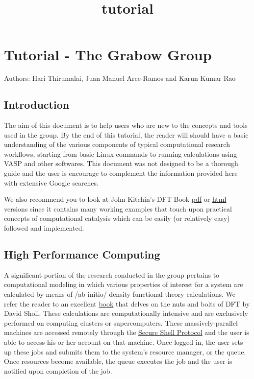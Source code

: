 \documentclass[11pt]{article}
\title{tutorial}
\begin{document}
    
    
    \maketitle
    
    

    
    \section{Tutorial - The Grabow Group}\label{tutorial---the-grabow-group}

Authors: Hari Thirumalai, Juan Manuel Arce-Ramos and Karun Kumar Rao

    \subsection{Introduction}\label{introduction}

The aim of this document is to help users who are new to the concepts
and tools used in the group. By the end of this tutorial, the reader
will should have a basic understanding of the various components of
typical computational research workflows, starting from basic Linux
commands to running calculations using VASP and other softwares. This
document was not designed to be a thorough guide and the user is
encourage to complement the information provided here with extensive
Google searches.

We also recommend you to look at John Kitchin's DFT Book
\href{http://kitchingroup.cheme.cmu.edu/dft-book/dft.pdf}{pdf} or
\href{http://kitchingroup.cheme.cmu.edu/dft-book/dft.html}{html}
versions since it contains many working examples that touch upon
practical concepts of computational catalysis which can be easily (or
relatively easy) followed and implemented.

    \subsection{High Performance
Computing}\label{high-performance-computing}

A significant portion of the research conducted in the group pertains to
computational modeling in which various properties of interest for a
system are calculated by means of /ab initio/ density functional theory
calculations. We refer the reader to an excellent
\href{https://www.wiley.com/en-us/Density+Functional+Theory\%3A+A+Practical+Introduction-p-9780470373170}{book}
that delves on the nuts and bolts of DFT by David Sholl. These
calculations are computationally intensive and are exclusively performed
on computing clusters or supercomputers. These massively-parallel
machines are accessed remotely through the
\href{https://www.ssh.com/ssh/protocol}{Secure Shell Protocol} and the
user is able to access his or her account on that machine. Once logged
in, the user sets up these jobs and submits them to the system's
resource manager, or the queue. Once resources become available, the
queue executes the job and the user is notified upon completion of the
job.
\end{document}
